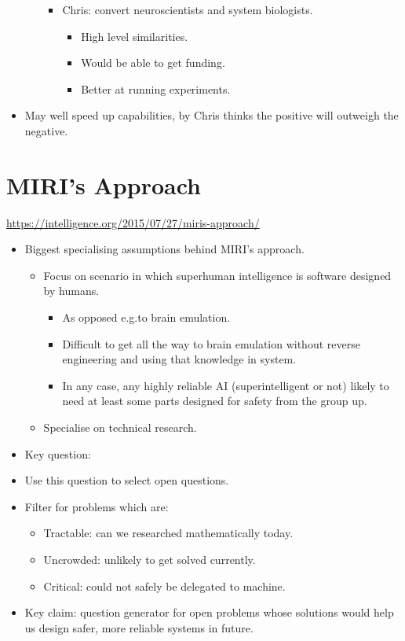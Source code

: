 \begin{itemize}
\begin{enumerate}[label=\arabic*.]
\begin{itemize}
            \item Chris: convert neuroscientists and system biologists.
            \begin{itemize}
                \item High level similarities.
                \item Would be able to get funding.
                \item Better at running experiments.
            \end{itemize}
        \end{itemize}
    \end{enumerate}
    \item May well speed up capabilities, by Chris thinks the positive will outweigh the negative.
\end{itemize}


\section{MIRI's Approach}

\url{https://intelligence.org/2015/07/27/miris-approach/}

\begin{itemize}
    \item Biggest specialising assumptions behind MIRI's approach.
    \begin{itemize}
        \item Focus on scenario in which superhuman intelligence is software designed by humans.
        \begin{itemize}
            \item As opposed e.g.\@ to brain emulation.
            \item Difficult to get all the way to brain emulation without reverse engineering and using that knowledge in system.
            \item In any case, any highly reliable AI (superintelligent or not) likely to need at least some parts designed for safety from the group up.
        \end{itemize}
        \item Specialise on technical research.
    \end{itemize}
    \item Key question: 
    \item Use this question to select open questions.
    \item Filter for problems which are:
    \begin{itemize}
        \item Tractable: can we researched mathematically today.
        \item Uncrowded: unlikely to get solved currently.
        \item Critical: could not safely be delegated to machine.
    \end{itemize}
    \item Key claim: question generator for open problems whose solutions would help us design safer, more reliable systems in future.
\end{itemize}


